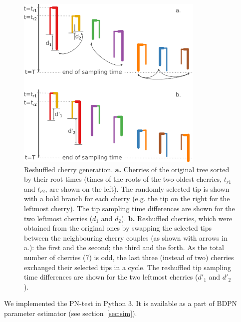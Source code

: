 \documentclass[a4paper,10pt]{article}
\begin{document}
\begin{figure}[tbhp]
\centering 
\includegraphics[width=0.8\textwidth]{Fig_cherryswap.png}
\caption{Reshuffled cherry generation. \textbf{a.} Cherries of the original tree sorted by their root times (times of the roots of the two oldest cherries, $t_{r1}$ and $t_{r2}$, are shown on the left). The randomly selected tip is shown with a bold branch for each cherry (e.g. the tip on the right for the leftmost cherry). The tip sampling time differences are shown for the two leftmost cherries ($d_1$ and $d_2$). \textbf{b.} Reshuffled cherries, which were obtained from the original ones by swapping the selected tips between the neighbouring cherry couples (as shown with arrows in a.): the first and the second; the third and the forth. As the total number of cherries (7) is odd, the last three (instead of two) cherries exchanged their selected tips in a cycle. The reshuffled tip sampling time differences are shown for the two leftmost cherries ($d'_1$ and $d'_2$).}
\label{fig:tipswap} 
\end{figure}



We implemented the PN-test in Python 3. It is available as a part of BDPN parameter estimator (see section~\ref{sec:sim}).
\end{document}
